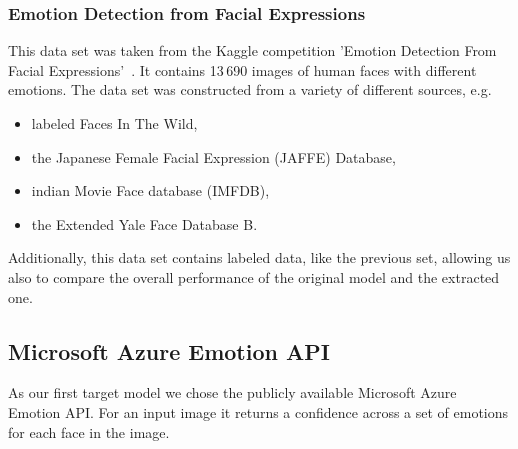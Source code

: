 \documentclass[a4paper,11pt]{article}
\begin{document}
        \subsubsection{Emotion Detection from Facial Expressions}
            This data set was taken from the Kaggle competition 'Emotion Detection From Facial Expressions'~\cite{kaggle-emotion}. 
            It contains 13\,690 images of human faces with different emotions. The data set was constructed from a variety of different sources, e.g.
            \begin{itemize}
                \item labeled Faces In The Wild,
                \item the Japanese Female Facial Expression (JAFFE) Database,
                \item indian Movie Face database (IMFDB),
                \item the Extended Yale Face Database B.
            \end{itemize}
            
            Additionally, this data set contains labeled data, like the previous set, allowing us also to compare the overall performance of the original model and the extracted one. 
    
    \subsection{Microsoft Azure Emotion API}
        As our first target model we chose the publicly available Microsoft Azure Emotion API. For an input image it returns a confidence across a set of emotions for each face in the image. 
        
\end{document}
